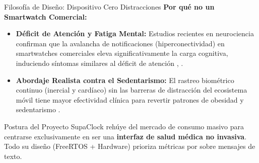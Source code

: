 \documentclass[aspectratio=169, 10pt]{beamer}
\begin{document}
\begin{frame}{Filosofía de Diseño: Dispositivo Cero Distracciones}
    \textbf{Por qué no un Smartwatch Comercial:}
    \vspace{0.2cm}
    \begin{itemize}
        \item \textbf{Déficit de Atención y Fatiga Mental:} Estudios recientes en neurociencia confirman que la avalancha de notificaciones (hiperconectividad) en smartwatches comerciales eleva significativamente la carga cognitiva, induciendo síntomas similares al déficit de atención \cite{Kushlev2016}, \cite{Pielot2014}.
        \item \textbf{Abordaje Realista contra el Sedentarismo:} El rastreo biométrico continuo (inercial y cardíaco) sin las barreras de distracción del ecosistema móvil tiene mayor efectividad clínica para revertir patrones de obesidad y sedentarismo \cite{Shin2019}.
    \end{itemize}
    \vspace{0.4cm}
    \begin{block}{Postura del Proyecto}
        SupaClock rehúye del mercado de consumo masivo para centrarse exclusivamente en ser una \textbf{interfaz de salud médica no invasiva}. Todo su diseño (FreeRTOS + Hardware) prioriza métricas por sobre mensajes de texto.
    \end{block}
\end{frame}
\end{document}
